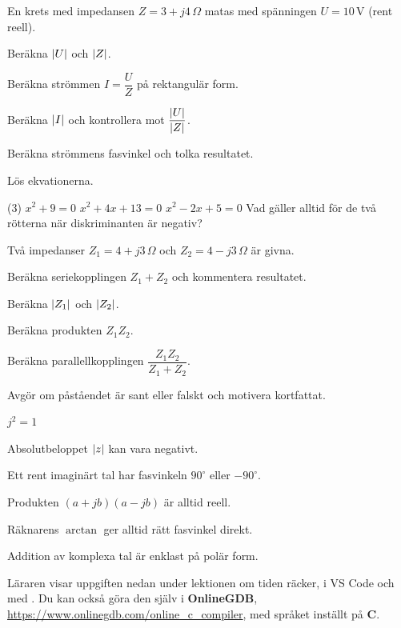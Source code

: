 En krets med impedansen $Z = 3 + j4\,\Omega$ matas med spänningen $U = 10\,\text{V}$ (rent reell).
\begin{parts}
  \item Beräkna $\lvert U\rvert$ och $\lvert Z\rvert$.
  \item Beräkna strömmen $I = \dfrac{U}{Z}$ på rektangulär form.
  \item Beräkna $\lvert I\rvert$ och kontrollera mot $\dfrac{\lvert U\rvert}{\lvert Z\rvert}$.
  \item Beräkna strömmens fasvinkel och tolka resultatet.
\end{parts}

Lös ekvationerna.
\begin{delar}(3)
  \task $x^2 + 9 = 0$
  \task $x^2 + 4x + 13 = 0$
  \task $x^2 - 2x + 5 = 0$
  \task* Vad gäller alltid för de två rötterna när diskriminanten är negativ?
\end{delar}

Två impedanser $Z_1 = 4 + j3\,\Omega$ och $Z_2 = 4 - j3\,\Omega$ är givna.
\begin{parts}
  \item Beräkna seriekopplingen $Z_1 + Z_2$ och kommentera resultatet.
  \item Beräkna $\lvert Z_1\rvert$ och $\lvert Z_2\rvert$.
  \item Beräkna produkten $Z_1Z_2$.
  \item Beräkna parallellkopplingen $\dfrac{Z_1Z_2}{Z_1 + Z_2}$.
\end{parts}

Avgör om påståendet är sant eller falskt och motivera kortfattat.
\begin{parts}
  \item $j^2 = 1$
  \item Absolutbeloppet $\lvert z\rvert$ kan vara negativt.
  \item Ett rent imaginärt tal har fasvinkeln $90^{\circ}$ eller $-90^{\circ}$.
  \item Produkten $(a + jb)(a - jb)$ är alltid reell.
  \item Räknarens $\arctan$ ger alltid rätt fasvinkel direkt.
  \item Addition av komplexa tal är enklast på polär form.
\end{parts}

Läraren visar uppgiften nedan under lektionen om tiden räcker, i VS Code och med .
Du kan också göra den
själv i \textbf{OnlineGDB}, \url{https://www.onlinegdb.com/online_c_compiler}, med språket inställt
på \textbf{C}.

